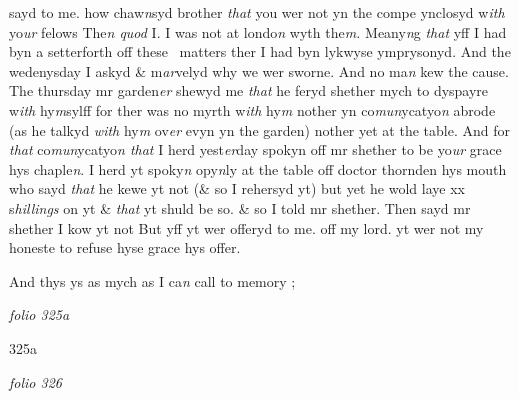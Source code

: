 \documentclass[12pt, a4paper]{book}
\begin{document}
sayd to me. how chaw\textit{n}syd brother \textit{that} you wer not yn the compe ynclosyd w\textit{ith} yo\textit{ur} felows
The\textit{n quod} I. I was not at londo\textit{n }wyth the\textit{m. }Meany\textit{n}g \textit{that }yff I had byn a setterforth off these  
matters ther I had byn lykwyse ymprysonyd. And the wedenysday I askyd \& m\textit{ar}velyd 
why we wer sworne. And no ma\textit{n} kew the cause. The thursday mr garden\textit{er }shewyd
me \textit{that} he feryd shether mych to dyspayre w\textit{ith} hy\textit{m}sylff for ther was no myrth w\textit{ith} hy\textit{m}
nother yn co\textit{mun}ycatyo\textit{n} abrode (as he talkyd \textit{with} hy\textit{m} ov\textit{er} evyn yn the garden) nother yet
at the table. And for \textit{that} co\textit{mun}ycatyo\textit{n that} I herd yest\textit{er}day spokyn off mr shether to be
yo\textit{ur} grace hys chaple\textit{n}. I herd yt spoky\textit{n} opy\textit{n}ly at the table off doctor thornden hys mouth
who sayd \textit{that} he kewe yt not (\& so I rehersyd yt) but yet he wold laye xx s\textit{hillings} on yt
\& \textit{that} yt shuld be so. \& so I told mr shether. Then sayd mr shether I kow yt not
But yff yt wer offeryd to me. off my lord. yt wer not my honeste to refuse hyse
grace hys offer.
            		
		\ifthenelse{\isodd{\thepage}}
		{\reversemarginpar}
		{\normalmarginpar}
		And thys ys as mych as I ca\textit{n} call to memory ;

\dotfill
						\newpage
{}

\textit{folio 325a}


         	
         	\begin{flushright}{\color{Gray}325a}\end{flushright}

\dotfill
						\newpage
{}

\textit{folio 326}


         \vspace*{4cm}
         
\dotfill
						  \section*{}  \subsection*{}
\end{document}
